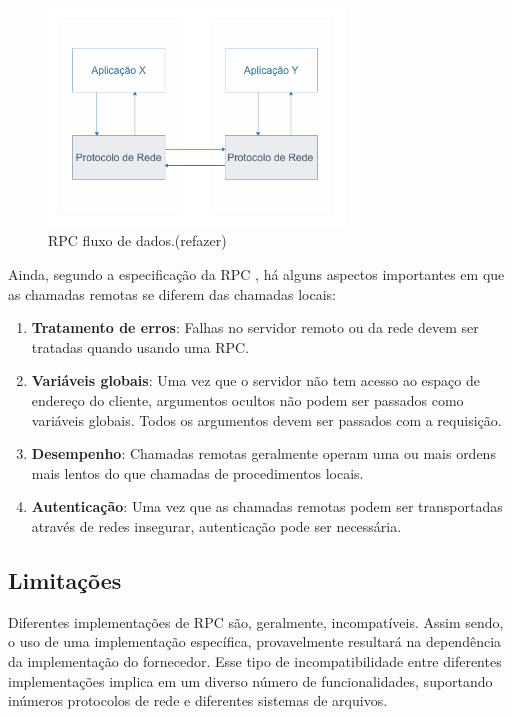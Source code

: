 \begin{figure}
\centering
\includegraphics[width=0.7\textwidth]{figuras/rpc.png}
\caption{RPC fluxo de dados.(refazer)}
\label{fig:rpc}
\end{figure}

Ainda, segundo a especificação da RPC \cite{rfc1831:rpc}, há alguns aspectos importantes em que as chamadas remotas se diferem das chamadas locais:

\begin{enumerate}[label=\alph*)]
\item \textbf{Tratamento de erros}: Falhas no servidor remoto ou da rede devem ser tratadas quando usando uma RPC.

\item \textbf{Variáveis globais}: Uma vez que o servidor não tem acesso ao espaço de endereço do cliente, argumentos ocultos não podem ser passados como variáveis globais. Todos os argumentos devem ser passados com a requisição.

\item \textbf{Desempenho}: Chamadas remotas geralmente operam uma ou mais ordens mais lentos do que chamadas de procedimentos locais.

\item \textbf{Autenticação}: Uma vez que as chamadas remotas podem ser transportadas através de redes insegurar, autenticação pode ser necessária.

\end{enumerate}

\subsection{Limitações}

Diferentes implementações de RPC são, geralmente, incompatíveis. Assim sendo, o uso de uma implementação específica, provavelmente resultará na dependência da implementação do fornecedor. Esse tipo de incompatibilidade entre diferentes implementações implica em um diverso número de funcionalidades, suportando inúmeros protocolos de rede e diferentes sistemas de arquivos.

